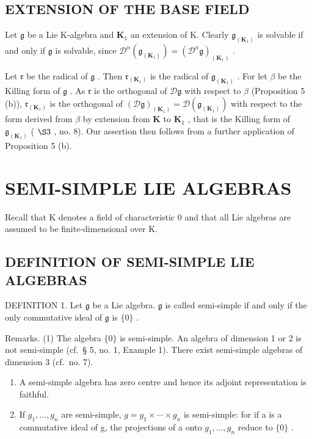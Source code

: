\subsection{EXTENSION OF THE BASE FIELD}

Let \(\mathfrak{g}\) be a Lie K-algebra and \(\mathbf{K}_1\) an extension of K. Clearly \(\mathfrak{g}_{(\mathbf{K}_1)}\) is solvable if and only if \(\mathfrak{g}\) is solvable, since \(\mathcal{D}^n (\mathfrak{g}_{(\mathbf{K}_1)}) = (\mathcal{D}^n\mathfrak{g})_{(\mathbf{K}_1)}\) .

Let \(\mathfrak{r}\) be the radical of \(\mathfrak{g}\) . Then \(\mathfrak{r}_{(\mathbf{K}_1)}\) is the radical of \(\mathfrak{g}_{(\mathbf{K}_1)}\) . For let \(\beta\) be the Killing form of \(\mathfrak{g}\) . As \(\mathfrak{r}\) is the orthogonal of \(\mathcal{D}\mathfrak{g}\) with respect to \(\beta\) (Proposition 5 (b)), \(\mathfrak{r}_{(\mathbf{K}_1)}\) is the orthogonal of \((\mathcal{D}\mathfrak{g})_{(\mathbf{K}_1)} = \mathcal{D}(\mathfrak{g}_{(\mathbf{K}_1)})\) with respect to the form derived from \(\beta\) by extension from \(\mathbf{K}\) to \(\mathbf{K}_1\) , that is the Killing form of \(\mathfrak{g}_{(\mathbf{K}_1)}\) ( \(\S 3\) , no. 8). Our assertion then follows from a further application of Proposition 5 (b).

\section{SEMI-SIMPLE LIE ALGEBRAS}

Recall that K denotes a field of characteristic 0 and that all Lie algebras are assumed to be finite-dimensional over K.

\subsection{DEFINITION OF SEMI-SIMPLE LIE ALGEBRAS}

DEFINITION 1. Let \(\mathfrak{g}\) be a Lie algebra. \(\mathfrak{g}\) is called semi-simple if and only if the only commutative ideal of \(\mathfrak{g}\) is \(\{0\}\) .

Remarks. (1) The algebra \(\{0\}\) is semi-simple. An algebra of dimension 1 or 2 is not semi-simple (cf.~§ 5, no. 1, Example 1). There exist semi-simple algebras of dimension 3 (cf.~no. 7).

\begin{enumerate}
\def\labelenumi{(\arabic{enumi})}
\setcounter{enumi}{1}
\item
  A semi-simple algebra has zero centre and hence its adjoint representation is faithful.
\item
  If \(g_{1}, \ldots, g_{n}\) are semi-simple, \(g = g_{1} \times \cdots \times g_{n}\) is semi-simple: for if a is a commutative ideal of g, the projections of a onto \(g_{1}, \ldots, g_{n}\) reduce to \(\{0\}\) .
\end{enumerate}

